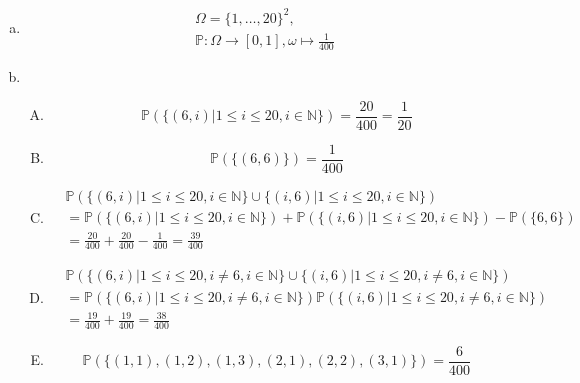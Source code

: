 \documentclass{article}
\newcommand{\N}{\mathbb{N}}
\renewcommand{\P}{\mathbb{P}}
\begin{document}
    \subsection{}
    \begin{enumerate}[a)]
        \item
            \begin{align*}
                \Omega = \{1,\hdots,20\}^2,\\
                \P: \Omega\rightarrow [0,1],
                \omega\mapsto\frac{1}{400}
            \end{align*}
        \item
            \begin{enumerate}[A)]
                \item
                    \begin{equation*}
                        \P(\{(6,i)|1\leq i\leq 20, i\in\N\})
                        =\frac{20}{400}=\frac{1}{20}
                    \end{equation*}
                \item
                    \begin{equation*}
                        \P(\{(6,6)\})
                        =\frac{1}{400}
                    \end{equation*}
                \item
                    \begin{align*}
                        &\P(
                            \{(6,i)|1\leq i\leq 20, i\in\N\}\cup
                            \{(i,6)|1\leq i\leq 20, i\in\N\}
                        )\\
                        &=
                        \P(\{(6,i)|1\leq i\leq 20, i\in\N\})+
                        \P(\{(i,6)|1\leq i\leq 20, i\in\N\})-
                        \P(\{6,6\})\\
                        &=\frac{20}{400}+\frac{20}{400}-\frac{1}{400}
                        =\frac{39}{400}
                    \end{align*}
                \item
                    \begin{align*}
                        &\P(
                            \{(6,i)|1\leq i\leq 20, i\neq 6, i\in\N\}\cup
                            \{(i,6)|1\leq i\leq 20, i\neq 6, i\in\N\}
                        )\\
                        &=
                        \P(\{(6,i)|1\leq i\leq 20, i\neq 6, i\in\N\})
                        \P(\{(i,6)|1\leq i\leq 20, i\neq 6, i\in\N\})\\
                        &=\frac{19}{400}+\frac{19}{400}=\frac{38}{400}
                    \end{align*}
                \item
                    \begin{equation*}
                        \P(\{(1,1),(1,2),(1,3),(2,1),(2,2),(3,1)\})
                        =\frac{6}{400}
                    \end{equation*}
            \end{enumerate}
    \end{enumerate}
\end{document}
